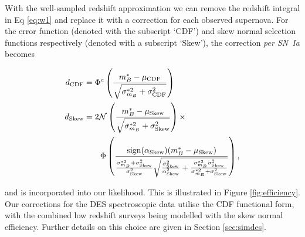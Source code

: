 \documentclass[a4paper,fleqn,usenatbib]{emulateapj}
\begin{document}
With the well-sampled redshift approximation we can remove the redshift integral in Eq \eqref{eq:w1} and replace it with a correction for each observed supernova. For the error function (denoted with the subscript `CDF') and skew normal selection functions respectively (denoted with a subscript `Skew'), the correction \textit{per SN~Ia} becomes

\begin{align}
d_{\rm CDF} &= \Phi^c\left(  \frac{m^*_B - \mu_{\rm CDF}}{\sqrt{\sigma^{*2}_{m_B} + \sigma_{\rm CDF}^2}}  \right) \label{eq:seldes}\\
d_{\rm Skew} &= 2\mathcal{N}\left( \frac{m_B^* - \mu_{\rm Skew}}{\sqrt{\sigma^{*2}_{m_B} + \sigma_{\rm Skew}^2}}\right) \times \notag\\
&\quad\quad \Phi\left(  \frac{{\rm sign}(\alpha_{\rm Skew})(m_B^* - \mu_{\rm Skew})}{\frac{\sigma_{m_B}^{*2} + \sigma^2_{\rm Skew}}{\sigma^2_{\rm Skew}} \sqrt{\frac{\sigma^2_{\rm Skew}}{\alpha^2_{\rm Skew}} + \frac{\sigma_{m_B}^{*2} \sigma^2_{\rm Skew}}{\sigma_{m_B}^{*2} + \sigma^2_{\rm Skew}}} }\right), \label{eq:sellow-$z$}
\end{align}

and is incorporated into our likelihood. This is illustrated in Figure \ref{fig:efficiency}. Our corrections for the DES spectroscopic data utilise the CDF functional form, with the combined low redshift surveys being modelled with the skew normal efficiency. Further details on this choice are given in Section \ref{sec:simdes}.
\end{document}
